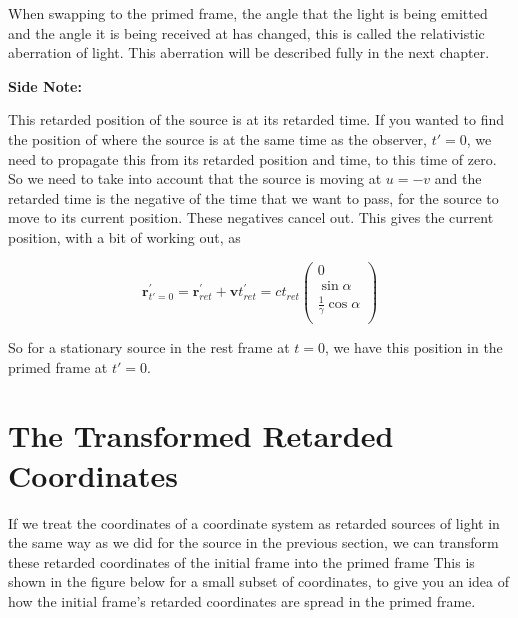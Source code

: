 When swapping to the primed frame, the angle that the light is being emitted and the angle it is being received at has changed, this is called the relativistic aberration of light.
This aberration will be described fully in the next chapter.

\textbf{Side Note:}

This retarded position of the source is at its retarded time.
If you wanted to find the position of where the source is at the same time as the observer, $t'=0$, we need to propagate this from its retarded position and time, to this time of zero.
So we need to take into account that the source is moving at $u = -v$ and the retarded time is the negative of the time that we want to pass, for the source to move to its current position.
These negatives cancel out.
This gives the current position, with a bit of working out, as

\begin{equation}
	\label{eq: primed position with synced times}
	\mathbf{r}_{{t{'}} = 0}^{'} = \mathbf{r}_{ret}^{'} + \mathbf{v}t_{ret}^{'} = {c}{{t}_{ret}}
	\begin{pmatrix}
		0                               \\
		\sin{\alpha}                    \\
		\frac{1}{{\gamma}} \cos{\alpha} \\
	\end{pmatrix}
\end{equation}

So for a stationary source in the rest frame at $t=0$, we have this position in the primed frame at $t'=0$.

\section{The Transformed Retarded Coordinates} \label{sect: Delayed View of Transformed Coordinates}

If we treat the coordinates of a coordinate system as retarded sources of light in the same way as we did for the source in the previous section, we can transform these retarded coordinates of the initial frame into the primed frame
This is shown in the figure below for a small subset of coordinates, to give you an idea of how the initial frame's retarded coordinates are spread in the primed frame.

